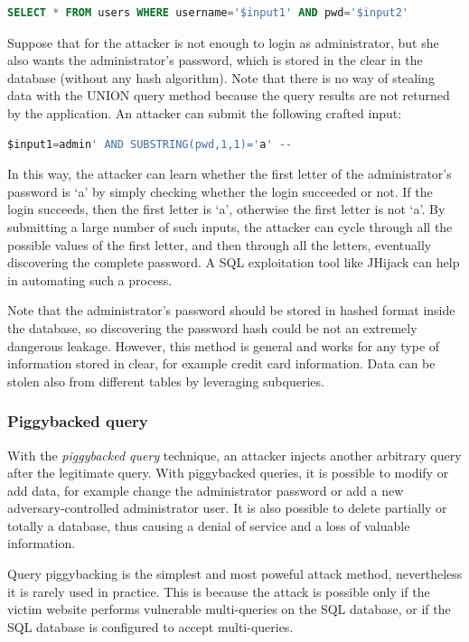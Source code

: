 \documentclass[a4paper,12pt]{article}
\begin{document}
\begin{lstlisting}[language=SQL, basicstyle=\ttfamily]
SELECT * FROM users WHERE username='$input1' AND pwd='$input2'
\end{lstlisting}

Suppose that for the attacker is not enough to login as administrator, but she also wants the administrator’s password, which is stored in the clear in the database (without any hash algorithm). Note that there is no way of stealing data with the UNION query method because the query results are not returned by the application.
An attacker can submit the following crafted input:

\begin{lstlisting}[language=SQL, basicstyle=\ttfamily]
$input1=admin' AND SUBSTRING(pwd,1,1)='a' --
\end{lstlisting}

In this way, the attacker can learn whether the first letter of the administrator’s password is ‘a’ by simply checking whether the login succeeded or not. If the login succeeds, then the first letter is ‘a’, otherwise the first letter is not ‘a’. By submitting a large number of such inputs, the attacker can cycle through all the possible values of the first letter, and then through all the letters, eventually discovering the complete password. A SQL exploitation tool like JHijack can help in automating such a process.

Note that the administrator’s password should be stored in hashed format inside the database, so discovering the password hash could be not an extremely dangerous leakage. However, this method is general and works for any type of information stored in clear, for example credit card information. Data can be stolen also from different tables by leveraging subqueries.

\subsubsection{Piggybacked query}
With the \textit{piggybacked query} technique, an attacker injects another arbitrary query after the legitimate query. With piggybacked queries, it is possible to modify or add data, for example change the administrator password or add a new adversary-controlled administrator user. It is also possible to delete partially or totally a database, thus causing a denial of service and a loss of valuable information.

Query piggybacking is the simplest and most poweful attack method, nevertheless it is rarely used in practice. This is because the attack is possible only if the victim website performs vulnerable multi-queries on the SQL database, or if the SQL database is configured to accept multi-queries.
\end{document}
